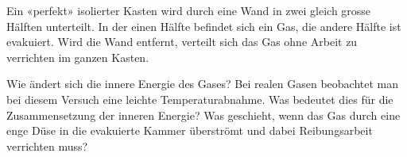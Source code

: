 Ein «perfekt» isolierter Kasten wird durch eine Wand in zwei gleich grosse Hälften unterteilt. In der einen Hälfte befindet sich ein Gas, die andere Hälfte ist evakuiert. Wird die Wand entfernt, verteilt sich das Gas ohne Arbeit zu verrichten im ganzen Kasten.
\begin{abcliste}
\abc Wie ändert sich die innere Energie des Gases?
\abc Bei realen Gasen beobachtet man bei diesem Versuch eine leichte Temperaturabnahme. Was bedeutet dies für die Zusammensetzung der inneren Energie?
\abc Was geschieht, wenn das Gas durch eine enge Düse in die evakuierte Kammer überströmt und dabei Reibungsarbeit verrichten muss?
\end{abcliste}
